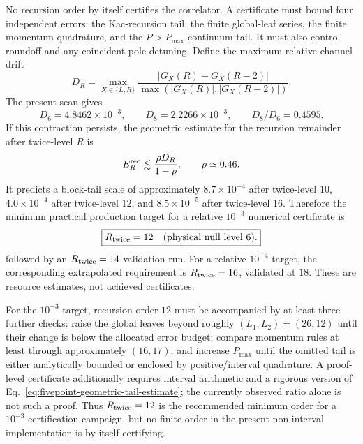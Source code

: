 \documentclass[11pt]{article}
\begin{document}
No recursion order by itself certifies the correlator.  A certificate must
bound four independent errors: the Kac-recursion tail, the finite global-leaf
series, the finite momentum quadrature, and the \(P>P_{\max}\) continuum
tail.  It must also control roundoff and any coincident-pole detuning.  Define
the maximum relative channel drift
\begin{equation}
 D_R=\max_{X\in\{L,R\}}
 \frac{|G_X(R)-G_X(R-2)|}
      {\max(|G_X(R)|,|G_X(R-2)|)}.
 \label{eq:fivepoint-channel-drift}
\end{equation}
The present scan gives
\begin{equation}
 D_6=4.8462\times10^{-3},\qquad
 D_8=2.2266\times10^{-3},
 \qquad D_8/D_6=0.4595.
 \label{eq:fivepoint-observed-contraction}
\end{equation}
If this contraction persists, the geometric estimate for the recursion
remainder after twice-level \(R\) is
\begin{equation}
 E_R^{\rm rec}
 \lesssim \frac{\rho D_R}{1-\rho},
 \qquad \rho\simeq0.46.
 \label{eq:fivepoint-geometric-tail-estimate}
\end{equation}
It predicts a block-tail scale of approximately \(8.7\times10^{-4}\) after
twice-level \(10\), \(4.0\times10^{-4}\) after twice-level \(12\), and
\(8.5\times10^{-5}\) after twice-level \(16\).  Therefore the minimum
practical production target for a relative \(10^{-3}\) numerical certificate
is
\begin{equation}
 \boxed{R_{\rm twice}=12\quad
        \text{(physical null level }6\text{)}.}
 \label{eq:fivepoint-minimum-certification-order}
\end{equation}
followed by an \(R_{\rm twice}=14\) validation run.  For a relative
\(10^{-4}\) target, the corresponding extrapolated requirement is
\(R_{\rm twice}=16\), validated at \(18\).  These are resource estimates,
not achieved certificates.

For the \(10^{-3}\) target, recursion order \(12\) must be accompanied by at
least three further checks: raise the global leaves beyond roughly
\((L_1,L_2)=(26,12)\) until their change is below the allocated error
budget; compare momentum rules at least through approximately \((16,17)\);
and increase \(P_{\max}\) until the omitted tail is either analytically
bounded or enclosed by positive/interval quadrature.  A proof-level
certificate additionally requires interval arithmetic and a rigorous
version of Eq.~\eqref{eq:fivepoint-geometric-tail-estimate}; the currently
observed ratio alone is not such a proof.  Thus \(R_{\rm twice}=12\) is the
recommended minimum order for a \(10^{-3}\) certification campaign, but no
finite order in the present non-interval implementation is by itself
certifying.
\end{document}
